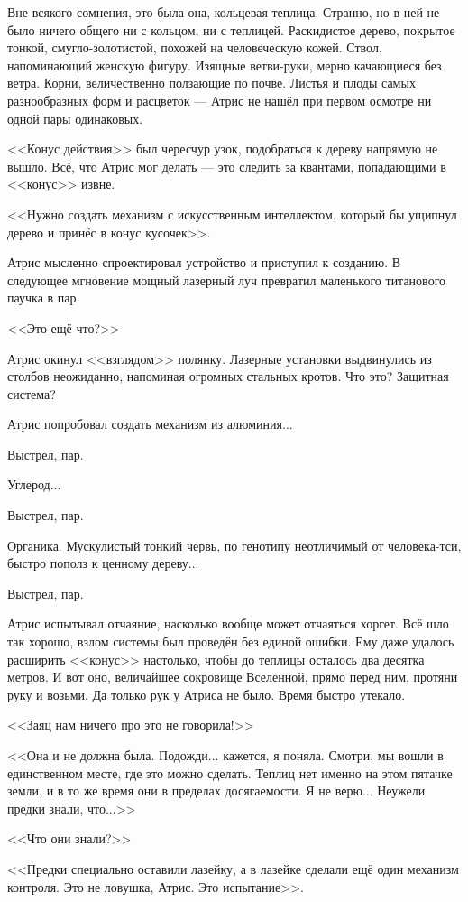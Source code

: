 Вне всякого сомнения, это была она, кольцевая теплица.
Странно, но в ней не было ничего общего ни с кольцом, ни с теплицей.
Раскидистое дерево, покрытое тонкой, смугло-золотистой, похожей на человеческую кожей.
Ствол, напоминающий женскую фигуру.
Изящные ветви-руки, мерно качающиеся без ветра.
Корни, величественно ползающие по почве.
Листья и плоды самых разнообразных форм и расцветок --- Атрис не нашёл при первом осмотре ни одной пары одинаковых.

<<Конус действия>> был чересчур узок, подобраться к дереву напрямую не вышло.
Всё, что Атрис мог делать --- это следить за квантами, попадающими в <<конус>> извне.

<<Нужно создать механизм с искусственным интеллектом, который бы ущипнул дерево и принёс в конус кусочек>>.

Атрис мысленно спроектировал устройство и приступил к созданию.
В следующее мгновение мощный лазерный луч превратил маленького титанового паучка в пар.

<<Это ещё что?>>

Атрис окинул <<взглядом>> полянку.
Лазерные установки выдвинулись из столбов неожиданно, напоминая огромных стальных кротов.
Что это?
Защитная система?

Атрис попробовал создать механизм из алюминия...

Выстрел, пар.

Углерод...

Выстрел, пар.

Органика.
Мускулистый тонкий червь, по генотипу неотличимый от человека-тси, быстро пополз к ценному дереву...

Выстрел, пар.

Атрис испытывал отчаяние, насколько вообще может отчаяться хоргет.
Всё шло так хорошо, взлом системы был проведён без единой ошибки.
Ему даже удалось расширить <<конус>> настолько, чтобы до теплицы осталось два десятка метров.
И вот оно, величайшее сокровище Вселенной, прямо перед ним, протяни руку и возьми.
Да только рук у Атриса не было.
Время быстро утекало.

<<Заяц нам ничего про это не говорила!>>

<<Она и не должна была.
Подожди... кажется, я поняла.
Смотри, мы вошли в единственном месте, где это можно сделать.
Теплиц нет именно на этом пятачке земли, и в то же время они в пределах досягаемости.
Я не верю...
Неужели предки знали, что...>>

<<Что они знали?>>

<<Предки специально оставили лазейку, а в лазейке сделали ещё один механизм контроля.
Это не ловушка, Атрис.
Это испытание>>.

